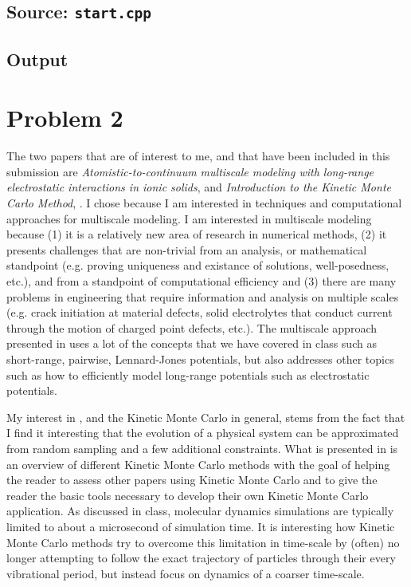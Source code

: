 \documentclass{article}
\begin{document}
\pagebreak

\subsection{Source: \texttt{start.cpp}} \label{sec:src1}

{\centering \small

}

\pagebreak

\subsection{Output} \label{sec:output1}

{\centering \small
{}
}

\section{Problem 2}

The two papers that are of interest to me, and that have been included in this submission are \textit{Atomistic-to-continuum multiscale modeling with long-range electrostatic interactions in ionic solids}, \citet{marshall2014atomistic} and \textit{Introduction to the Kinetic Monte Carlo Method}, \citet{voter2007introduction}.
I chose \cite{marshall2014atomistic} because I am interested in techniques and computational approaches for multiscale modeling.
I am interested in multiscale modeling because (1) it is a relatively new area of research in numerical methods, (2) it presents challenges that are non-trivial from an analysis, or mathematical standpoint (e.g. proving uniqueness and existance of solutions, well-posedness, etc.), and from a standpoint of computational efficiency and (3) there are many problems in engineering that require information and analysis on multiple scales (e.g. crack initiation at material defects, solid electrolytes that conduct current through the motion of charged point defects, etc.).
The multiscale approach presented in \cite{marshall2014atomistic} uses a lot of the concepts that we have covered in class such as short-range, pairwise, Lennard-Jones potentials, but also addresses other topics such as how to efficiently model long-range potentials such as electrostatic potentials.

My interest in \cite{voter2007introduction}, and the Kinetic Monte Carlo in general, stems from the fact that I find it interesting that the evolution of a physical system can be approximated from random sampling and a few additional constraints.
What is presented in \cite{voter2007introduction} is an overview of different Kinetic Monte Carlo methods with the goal of helping the reader to assess other papers using Kinetic Monte Carlo and to give the reader the basic tools necessary to develop their own Kinetic Monte Carlo application.
As discussed in class, molecular dynamics simulations are typically limited to about a microsecond of simulation time.
It is interesting how Kinetic Monte Carlo methods try to overcome this limitation in time-scale by (often) no longer attempting to follow the exact trajectory of particles through their every vibrational period, but instead focus on dynamics of a coarser time-scale.
\end{document}
